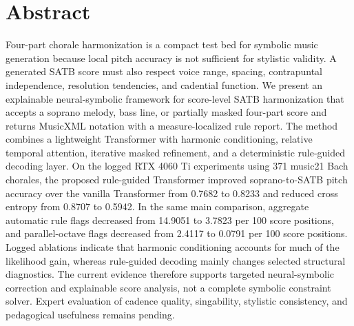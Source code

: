 \section*{Abstract}

Four-part chorale harmonization is a compact test bed for symbolic music generation because local pitch accuracy is not sufficient for stylistic validity. A generated SATB score must also respect voice range, spacing, contrapuntal independence, resolution tendencies, and cadential function. We present an explainable neural-symbolic framework for score-level SATB harmonization that accepts a soprano melody, bass line, or partially masked four-part score and returns MusicXML notation with a measure-localized rule report. The method combines a lightweight Transformer with harmonic conditioning, relative temporal attention, iterative masked refinement, and a deterministic rule-guided decoding layer. On the logged RTX 4060 Ti experiments using 371 music21 Bach chorales, the proposed rule-guided Transformer improved soprano-to-SATB pitch accuracy over the vanilla Transformer from 0.7682 to 0.8233 and reduced cross entropy from 0.8707 to 0.5942. In the same main comparison, aggregate automatic rule flags decreased from 14.9051 to 3.7823 per 100 score positions, and parallel-octave flags decreased from 2.4117 to 0.0791 per 100 score positions. Logged ablations indicate that harmonic conditioning accounts for much of the likelihood gain, whereas rule-guided decoding mainly changes selected structural diagnostics. The current evidence therefore supports targeted neural-symbolic correction and explainable score analysis, not a complete symbolic constraint solver. Expert evaluation of cadence quality, singability, stylistic consistency, and pedagogical usefulness remains pending.
